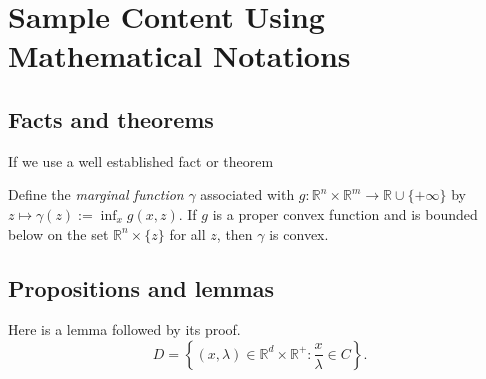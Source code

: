 \documentclass[msc,oneside]{ubcthesis}%
\newcommand{\R}{\mathbb{R}}   %
\begin{document}






\chapter{Sample Content Using Mathematical Notations}

\section{Facts and theorems}
If we use a well established fact or theorem\ 

\begin{fact}\cite[Theorem~IV.2.4.2]{Hiriart-Urruty:1993-ConvexAnalysis}\label{def:marginalfunc}
Define the \emph{marginal function} $\gamma$ associated with $g:\R^n\times\R^m\rightarrow \R\cup
\{+\infty\}$ by $z\mapsto \gamma(z):=\inf_x
g(x,z)$. If $g$ is a proper convex function and is bounded below on the set  $\R^n \times \{z\}$ for all $z$, then $\gamma$ is convex.
\end{fact}

\section{Propositions and lemmas}
Here is a lemma followed by its proof.
\[
D =\left\{ (x,\lambda)\in \R^d \times \R^+ : \frac{x}{\lambda} \in C\right\}.
\]
\end{document}
